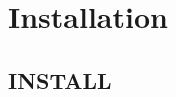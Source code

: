 \section{Installation}
\label{group__install}
\subsection{INSTALL}\label{group__install_install}

\begin{DoxyCodeInclude}
\end{DoxyCodeInclude}
 
